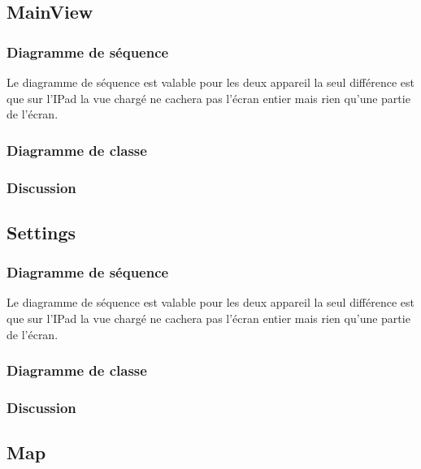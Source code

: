	\subsection{MainView}
		\subsubsection*{Diagramme de séquence}
			Le diagramme de séquence est valable pour les deux appareil la seul différence est que sur l'IPad la vue chargé  ne cachera pas l'écran entier mais rien qu'une partie de l'écran.
		\subsubsection*{Diagramme de classe}
		\subsubsection*{Discussion}
	\subsection{Settings}
		\subsubsection*{Diagramme de séquence}
			Le diagramme de séquence est valable pour les deux appareil la seul différence est que sur l'IPad la vue chargé  ne cachera pas l'écran entier mais rien qu'une partie de l'écran.
		\subsubsection*{Diagramme de classe}
		\subsubsection*{Discussion}
		
	\subsection{Map}

